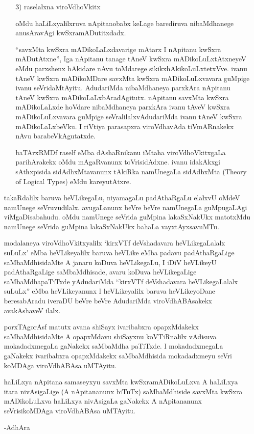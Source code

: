 \begin{itemize}
\item[{\rm 3)}] raselalxna viroVdhoVkitx

oMdu haLiLxyalilxruva nApitanobabx keLage barediruva nibaMdhanege anusAra\-vAgi kwSxramADutitxdadx.

``savxMta kwSxra mADikoLaLxdavarige mAtarx I nApitanu kwSxra mADutAtxne'', Iga nApitanu tanage tAneV kwSxra mADikoLuLxtAtxneyeV eMdu parxshenx hAkidare nAvu toMdarege sikikxhAkikoLuLxtetxVve. ivanu tAneV kwSxra mADikoMDare savxMta kwSxra mADikoLuLxvavara guMpige ivanu seVridaMtAyitu. AdudariMda nibaMdhaneya parxkAra nApitanu tAneV kwSxra mADikoLaLxbAradAgitutx. nApitanu savxMta kwSxra mADikoLaLxde hoVdare nibaMdhaneya parxkAra ivanu tAveV kwSxra mADikoLuLxvavara guMpige seVralilalxvAdudariMda ivanu tAneV kwSxra mADikoLaLxbeVku. I riVtiya parasapxra viroVdhavAda tiVmARnakekx nAvu barabeVkAgutatxde.

baTArxRMDf raself eMba dAshaRnikanu iMtaha viroVdhoVkitxgaLa parihArakekx oMdu mAgaRvanunx toVrisidAdxne. ivanu idakAkxgi sAthxpisida sidAdhxMtavanunx tAkiRka namUnegaLa sidAdhxMta {\rm (Theory of Logical Types)} eMdu kareyutAtxre.
\end{itemize}

takaRdalilx baruva heVLikegaLu, niyamagaLu padAthaRgaLu elalxvU oMdeV namUnege seVruvudilalx. avugaLanunx beVre beVre namUnegaLa guMpugaLAgi viMgaDisabahudu. oMdu namUnege seVrida guMpina lakaSxNakUkx matotxMdu namUnege seVrida guMpina lakaSxNakUkx bahaLa vayxtAyxsavuMTu.

modalaneya viroVdhoVkitxyalilx `kirxVTf deVshadavara heVLikegaLalalx suLuLx' eMba heVLikeyalilx baruva heVLike eMba padavu padAthaRgaLige saMbaMdhisidaMte A janaru koDuva heVLikegaLu, I iDiV heVLikeyU padAthaRgaLige saMbaMdhisade, avaru koDuva heVLikegaLige saMbaMdhapaTiTxde yAdudariMda ``kirxVTf deVshadavara heVLikegaLalalx suLuLx'' eMba heVLikeyanunx I heVLikeyalilx baruva heVLikeyoDane beresabAradu iveraDU beVre beVre AdudariMda viroVdhABAsakekx avakAshaveV ilalx.

porxTAgorAsf matutx avana shiSayx ivaribabxra opapxMdakekx saMbaMdhisidaMte A opapxMdavu shiSayxnu koVTiRnalilx vAdisuva mokadadxmegaLa gaNakekx saMbaMdha paTiTxde. I mokadadxmegaLa gaNakekx ivaribabxra opapxMdakekx saMbaMdhisida mokadadxmeyu seVri koMDAga viroVdhABAsa uMTAyitu.

haLiLxya nApitana samaseyxyu savxMta kwSxramADikoLuLxva A haLiLxya itara nivAsigaLige (A nApitananunx biTuTx) saMbaMdhiside savxMta kwSxra mADikoLuLxva haLiLxya nivAsigaLa gaNakekx A nApitananunx seVrisikoMDAga viroVdhABAsa uMTAyitu.

\hfill{-AdhAra}


